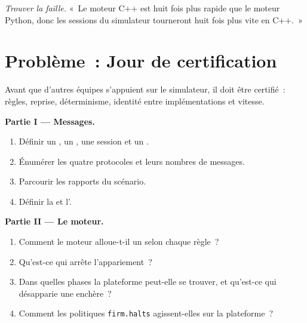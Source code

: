 \begin{exercise}[$\star\star\star$]\label{exo:mx:build-a-matching-engine-and-exchange-simulator:8}
\emph{Trouver la faille.} «~Le moteur C++ est huit fois plus rapide que le moteur Python, donc les sessions du simulateur tourneront huit fois plus vite en C++.~»
\end{exercise}

\section{Problème~: Jour de certification}

\begin{problem}\label{pb:mx:build-a-matching-engine-and-exchange-simulator:1}
Avant que d'autres équipes s'appuient sur le simulateur, il doit être certifié~: règles, reprise, déterminisme, identité entre implémentations et vitesse.

\medskip\noindent\textbf{Partie I --- Messages.}
\begin{enumerate}
\item Définir un , un , une session et un .
\item Énumérer les quatre protocoles et leurs nombres de messages.
\item Parcourir les rapports du scénario.
\item Définir la  et l'.
\end{enumerate}

\medskip\noindent\textbf{Partie II --- Le moteur.}
\begin{enumerate}[resume]
\item Comment le moteur alloue-t-il un  selon chaque règle~?
\item Qu'est-ce qui arrête l'appariement~?
\item Dans quelles phases la plateforme peut-elle se trouver, et qu'est-ce qui désapparie une enchère~?
\item Comment les politiques \texttt{firm.halts} agissent-elles sur la plateforme~?
\end{enumerate}


\end{problem}
